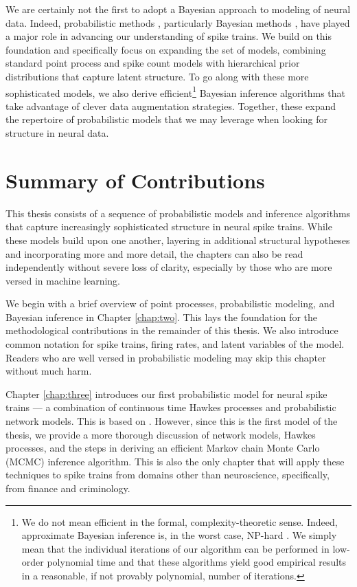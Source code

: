 We are certainly not the first to adopt a Bayesian approach to
modeling of neural data. Indeed, probabilistic methods
\citep[e.g.][]{brillinger1976identification, Brillinger-1988,
  Paninski-2004, Truccolo-2005, Pillow-2008}, particularly Bayesian
methods \citep[e.g.][]{sahani1999latent, rieke1999spikes, Yu09,
  park2011bayesian, macke2011empirical}, have played a major role in
advancing our understanding of spike trains.  We build on this
foundation and specifically focus on expanding the set of models,
combining standard point process and spike count models with
hierarchical prior distributions that capture latent structure. To go
along with these more sophisticated models, we also derive
efficient\footnote{We do not mean efficient in the formal,
  complexity-theoretic sense.  Indeed, approximate Bayesian inference
  is, in the worst case, NP-hard \citep{dagum1993approximating,
    roth1996hardness}.  We simply mean that the individual iterations
  of our algorithm can be performed in low-order polynomial time and
  that these algorithms yield good empirical results in a reasonable,
  if not provably polynomial, number of iterations.}  Bayesian
inference algorithms that take advantage of clever data augmentation
strategies. Together, these expand the repertoire of probabilistic
models that we may leverage when looking for structure in neural data.


\section{Summary of Contributions}

This thesis consists of a sequence of probabilistic models and
inference algorithms that capture increasingly sophisticated structure
in neural spike trains. While these models build upon one another,
layering in additional structural hypotheses and incorporating more
and more detail, the chapters can also be read independently without
severe loss of clarity, especially by those who are more versed in
machine learning.

We begin with a brief overview of point processes, probabilistic
modeling, and Bayesian inference in Chapter \ref{chap:two}.  This lays
the foundation for the methodological contributions in the remainder
of this thesis. We also introduce common notation for spike trains,
firing rates, and latent variables of the model.  Readers who are well
versed in probabilistic modeling may skip this chapter without much
harm.

Chapter \ref{chap:three} introduces our first probabilistic model for
neural spike trains --- a combination of continuous time Hawkes
processes and probabilistic network models. This is based on
\citet{linderman2014discovering}. However, since this is the first
model of the thesis, we provide a more thorough discussion of network
models, Hawkes processes, and the steps in deriving an efficient
Markov chain Monte Carlo (MCMC) inference algorithm.  This is also the
only chapter that will apply these techniques to spike trains from
domains other than neuroscience, specifically, from finance and
criminology.

